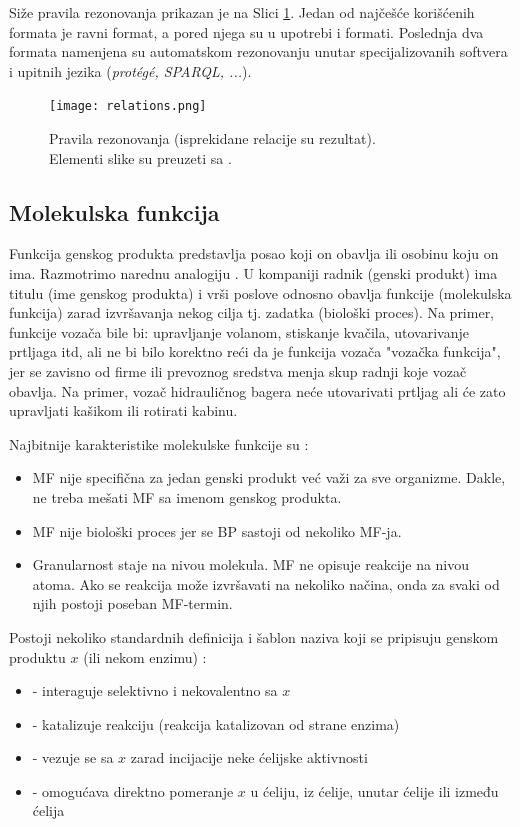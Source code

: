 Siže pravila rezonovanja prikazan je na Slici \ref{fig:relations}.
Jedan od najčešće korišćenih formata je  ravni  format, a pored njega
su u upotrebi  i  formati.  Poslednja dva formata
namenjena su automatskom rezonovanju unutar specijalizovanih softvera i upitnih
jezika (\textit{protégé, SPARQL, ...}).

\begin{figure}[h!]
  \centering
  \texttt{[image: relations.png]}
  \caption{Pravila rezonovanja (isprekidane relacije su rezultat). \\ Elementi slike su preuzeti sa \parencite{go_veb}.}
  \label{fig:relations}
\end{figure}


\subsection{Molekulska funkcija}
\label{MF}

Funkcija genskog produkta predstavlja posao koji on obavlja ili osobinu koju on ima.
Razmotrimo narednu analogiju \parencite{go_mf}.  U kompaniji radnik (genski produkt) ima titulu
(ime genskog produkta) i vrši poslove odnosno obavlja funkcije (molekulska
funkcija) zarad izvršavanja nekog cilja tj. zadatka (biološki proces). Na
primer, funkcije vozača bile bi: upravljanje volanom, stiskanje kvačila,
utovarivanje prtljaga itd, ali ne bi bilo korektno reći da je funkcija vozača
"vozačka funkcija", jer se zavisno od firme ili prevoznog sredstva menja skup
radnji koje vozač obavlja. Na primer, vozač hidrauličnog bagera neće
utovarivati prtljag ali će zato upravljati kašikom ili rotirati kabinu.

Najbitnije karakteristike molekulske funkcije su \parencite{go_mf}:
\begin{itemize}
  \item MF nije specifična za jedan genski produkt već važi za sve organizme. Dakle, ne treba mešati MF sa imenom genskog produkta.
  \item MF nije biološki proces jer se BP sastoji od nekoliko MF-ja.
  \item Granularnost staje na nivou molekula. MF ne opisuje reakcije na nivou
    atoma. Ako se reakcija može izvršavati na nekoliko načina, onda za svaki od njih
    postoji poseban MF-termin.
\end{itemize}

Postoji nekoliko standardnih definicija i šablon naziva koji se pripisuju genskom
produktu $x$ (ili nekom enzimu) \parencite{go_mf}:
\begin{itemize}
  \item {} - interaguje selektivno i nekovalentno sa $x$
  \item {} - katalizuje reakciju (reakcija katalizovan od strane enzima)
  \item {} - vezuje se sa $x$ zarad incijacije neke ćelijske aktivnosti
  \item {} - omogućava direktno pomeranje $x$ u ćeliju, iz ćelije, unutar ćelije ili između ćelija
\end{itemize}

